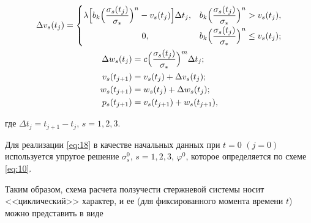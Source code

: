 \begin{gather}

\Delta  v _s ( t_{j} ) = \begin{cases}

\lambda \Bigl[ b_k \Bigl( \dfrac{\sigma_s ( t_{j} )}{\sigma_\ast} \Bigr)^{n}- v _s ( t_{j} )

\Bigr] \Delta t_{j},& 

b_k \Bigl( \dfrac{\sigma_s ( t_{j} )}{\sigma_\ast} \Bigr)^{n} >  v _s ( t_{j} ), \\[2mm]

\hspace{2.4cm}0, & b_k \Bigl( \dfrac{\sigma_s ( t_{j} )}{\sigma_\ast} \Bigr)^{n} \le  v _s ( t_{j} );

\end{cases} \\

\label{eq:18}

\begin{align}

\Delta w_s ( t_{j} ) &= c \Bigl( \frac{\sigma_s ( t_{j} )}{\sigma_\ast} \Bigr)^{m} \Delta t_{j}; \\

 v _s (t_{j+1}) &=  v _s (t_{j}) + \Delta  v _s (t_{j}); \\

w_s (t_{j+1}) &= w_s (t_{j}) + \Delta w_s (t_{j}); \\

p_s (t_{j+1}) &=  v _s (t_{j+1}) + w_s (t_{j+1}),

\end{align}

\end{gather}

где $\Delta t_{j} = t_{j+1} - t_{j}$, $s=1,2,3$.



Для реализации \eqref{eq:18} в качестве начальных данных при $t=0$ $(j=0)$ используется упругое решение $\sigma_s^0$, $s=1,2,3$, $\varphi^0$, которое определяется по схеме \eqref{eq:10}.



Таким образом, схема расчета ползучести стержневой системы носит <<циклический>> характер, и ее (для фиксированного момента времени $t$) можно представить в виде

